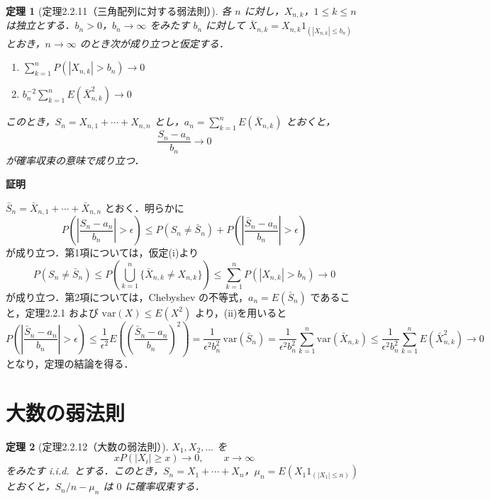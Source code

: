 \documentclass[dvipdfmx]{jsarticle}
\makeatletter
\numberwithin{equation}{section}
\theoremstyle{plain}
\newtheorem{thm}{定理}[section]
\renewenvironment{proof}[1][\proofname]{\par
  \pushQED{\qed}%
  \normalfont \topsep6\p@\@plus6\p@\relax
  \trivlist
  \item\relax
  {\bfseries
  #1\@addpunct{.}}\hspace\labelsep\ignorespaces
}{%
  \popQED\endtrivlist\@endpefalse
}
\renewcommand{\proofname}{証明}
\makeatother
\begin{document}
\begin{thm}[定理2.2.11（三角配列に対する弱法則）]
各 $n$ に対し，$X_{n,k}$，$1 \le k \le n$ は独立とする．$b_n > 0$，$b_n \to \infty$ をみたす $b_n$ に対して $\bar{X}_{n,k} = X_{n,k} 1_{(|X_{n,k}| \le b_n)}$ とおき，$n \to \infty$ のとき次が成り立つと仮定する．
\begin{enumerate}
  \item[(i)] $\displaystyle \sum_{k=1}^n P(|X_{n,k}| > b_n) \to 0$
  \item[(ii)] $\displaystyle b_n^{-2} \sum_{k=1}^n E(\bar{X}_{n,k}^2) \to 0$
\end{enumerate}
このとき，$S_n = X_{n,1} + \cdots + X_{n,n}$ とし，$a_n = \sum_{k=1}^n E(\bar{X}_{n,k})$ とおくと，
\[
  \frac{S_n - a_n}{b_n} \to 0
\]
が確率収束の意味で成り立つ．
\end{thm}

\begin{proof}
$\bar{S}_n = \bar{X}_{n,1} + \cdots + \bar{X}_{n,n}$ とおく．明らかに
\[
  P\!\left(\left|\frac{S_n - a_n}{b_n}\right| > \epsilon\right)
  \le P(S_n \ne \bar{S}_n) + P\!\left(\left|\frac{\bar{S}_n - a_n}{b_n}\right| > \epsilon\right)
\]
が成り立つ．第1項については，仮定(i)より
\[
  P(S_n \ne \bar{S}_n)
  \le P\!\left(\bigcup_{k=1}^n \{\bar{X}_{n,k} \ne X_{n,k}\}\right)
  \le \sum_{k=1}^n P(|X_{n,k}| > b_n) \to 0
\]
が成り立つ．第2項については，Chebyshev の不等式，$a_n = E(\bar{S}_n)$ であること，定理2.2.1 および $\mathrm{var}(X) \le E(X^2)$ より，(ii)を用いると
\[
  P\!\left(\left|\frac{\bar{S}_n - a_n}{b_n}\right| > \epsilon\right)
  \le \frac{1}{\epsilon^2} E\!\left(\left(\frac{\bar{S}_n - a_n}{b_n}\right)^2\right)
  = \frac{1}{\epsilon^2 b_n^2}\, \mathrm{var}(\bar{S}_n)
  = \frac{1}{\epsilon^2 b_n^2} \sum_{k=1}^n \mathrm{var}(\bar{X}_{n,k})
  \le \frac{1}{\epsilon^2 b_n^2} \sum_{k=1}^n E(\bar{X}_{n,k}^2) \to 0
\]
となり，定理の結論を得る．
\end{proof}

\section{大数の弱法則}

\begin{thm}[定理2.2.12（大数の弱法則）]
$X_1, X_2, \dots$ を
\[
  xP(|X_i| \ge x) \to 0, \qquad x \to \infty
\]
をみたす i.i.d.\ とする．このとき，$S_n = X_1 + \cdots + X_n$，$\mu_n = E(X_1 1_{(|X_1| \le n)})$ とおくと，$S_n/n - \mu_n$ は $0$ に確率収束する．
\end{thm}
\end{document}
